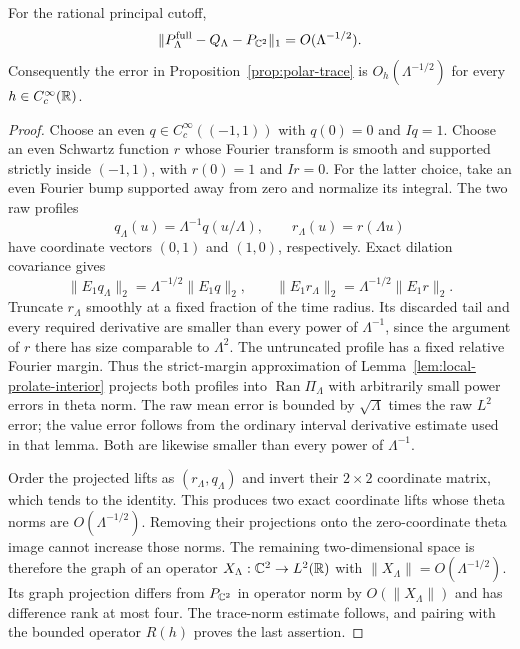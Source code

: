 \begin{corollary}
\label{cor:polar-rate}
For the rational principal cutoff,
\[
 \|P_\Lambda^{\rm full}-Q_\Lambda-P_{\mathbb C^2}\|_1
       =O(\Lambda^{-1/2}).
\]
Consequently the error in Proposition~\ref{prop:polar-trace} is
$O_h(\Lambda^{-1/2})$ for every $h\in C_c^\infty(\mathbb R)$.
\end{corollary}
\begin{proof}
Choose an even $q\in C_c^\infty((-1,1))$ with $q(0)=0$ and
$Iq=1$. Choose an even Schwartz function $r$ whose Fourier
transform is smooth and supported strictly inside $(-1,1)$,
with $r(0)=1$ and $Ir=0$. For the latter choice, take an even
Fourier bump supported away from zero and normalize its integral.
The two raw profiles
\[
 q_\Lambda(u)=\Lambda^{-1}q(u/\Lambda),\qquad
 r_\Lambda(u)=r(\Lambda u)
\]
have coordinate vectors $(0,1)$ and $(1,0)$, respectively.
Exact dilation covariance gives
\[
 \|E_1q_\Lambda\|_2=\Lambda^{-1/2}\|E_1q\|_2,
 \qquad
 \|E_1r_\Lambda\|_2=\Lambda^{-1/2}\|E_1r\|_2.
\]
Truncate $r_\Lambda$ smoothly at a fixed fraction of the time
radius. Its discarded tail and every required derivative are
smaller than every power of $\Lambda^{-1}$, since the argument
of $r$ there has size comparable to $\Lambda^2$. The untruncated
profile has a fixed relative Fourier margin. Thus the
strict-margin approximation of Lemma~\ref{lem:local-prolate-interior}
projects both profiles into $\operatorname{Ran}\Pi_\Lambda$ with
arbitrarily small power errors in theta norm. The raw mean error
is bounded by $\sqrt\Lambda$ times the raw $L^2$ error; the value
error follows from the ordinary interval derivative estimate
used in that lemma. Both are likewise smaller than every power
of $\Lambda^{-1}$.

Order the projected lifts as $(r_\Lambda,q_\Lambda)$ and invert
their $2\times2$ coordinate matrix, which tends to the identity.
This produces two exact coordinate lifts whose
theta norms are $O(\Lambda^{-1/2})$. Removing their projections
onto the zero-coordinate theta image cannot increase those norms.
The remaining two-dimensional space is therefore the graph of
an operator $X_\Lambda:\mathbb C^2\to L^2(\mathbb R)$ with
$\|X_\Lambda\|=O(\Lambda^{-1/2})$. Its graph projection differs
from $P_{\mathbb C^2}$ in operator norm by $O(\|X_\Lambda\|)$ and has
difference rank at most four. The trace-norm estimate follows,
and pairing with the bounded operator $R(h)$ proves the last
assertion.
\end{proof}
